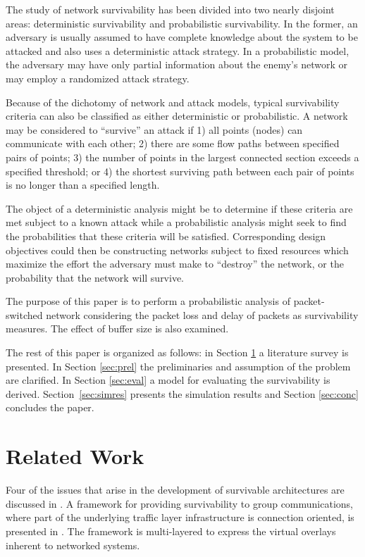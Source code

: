 \documentclass[onecolumn,conference]{IEEEtran}
\begin{document}
    The study of network survivability has been divided into two nearly disjoint areas: deterministic survivability and probabilistic survivability. In the former, an adversary is usually assumed to have complete knowledge about the system to be attacked and also uses a deterministic attack strategy. In a probabilistic model, the adversary may have only partial information about the enemy's network or may employ a randomized attack strategy.

    Because of the dichotomy of network and attack models, typical survivability criteria can also be classified as either deterministic or probabilistic. A network may be considered to ``survive'' an attack if 1) all points (nodes) can communicate with each other; 2) there are some flow paths between specified pairs of points; 3) the number of points in the largest connected section exceeds a specified threshold; or 4) the shortest surviving path between each pair of points is no longer than a specified length.

    The object of a deterministic analysis might be to determine if these criteria are met subject to a known attack while a probabilistic analysis might seek to find the probabilities that these criteria will be satisfied. Corresponding design objectives could then be constructing networks subject to fixed resources which maximize the effort the adversary must make to ``destroy'' the network, or the probability that the network will survive.

    The purpose of this paper is to perform a probabilistic analysis of packet-switched network considering the packet loss and delay of packets as survivability measures. The effect of buffer size is also examined.

    The rest of this paper is organized as follows: in Section \ref{sec:rlwork} a literature survey is presented. In Section \ref{sec:prel} the preliminaries and assumption of the problem are clarified. In Section \ref{sec:eval} a model for evaluating the survivability is derived. Section~\ref{sec:simres} presents the simulation results and Section \ref{sec:conc} concludes the paper.

    \section{Related Work} \label{sec:rlwork}
    Four of the issues that arise in the development of survivable architectures are discussed in \cite{b5}. A framework for providing survivability to group communications, where part of the underlying traffic layer infrastructure is connection oriented, is presented in \cite{b13}. The framework is multi-layered to express the virtual overlays inherent to networked systems.
\end{document}
